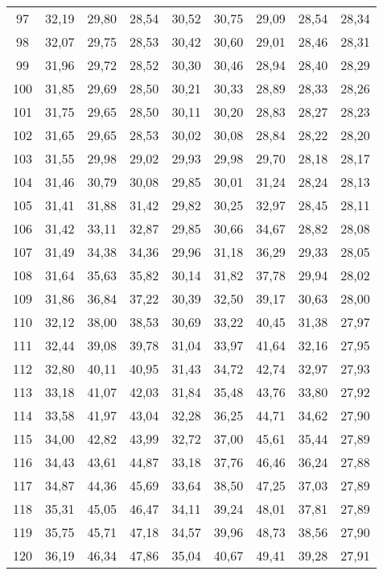 \begin{longtable}{c c c c c c c c c}
97	& 32,19	& 29,80	& 28,54	& 30,52	& 30,75	& 29,09	& 28,54	& 28,34 \\
98	& 32,07	& 29,75	& 28,53	& 30,42	& 30,60	& 29,01	& 28,46	& 28,31 \\
99	& 31,96	& 29,72	& 28,52	& 30,30	& 30,46	& 28,94	& 28,40	& 28,29 \\
100	& 31,85	& 29,69	& 28,50	& 30,21	& 30,33	& 28,89	& 28,33	& 28,26 \\
101	& 31,75	& 29,65	& 28,50	& 30,11	& 30,20	& 28,83	& 28,27	& 28,23 \\
102	& 31,65	& 29,65	& 28,53	& 30,02	& 30,08	& 28,84	& 28,22	& 28,20 \\
103	& 31,55	& 29,98	& 29,02	& 29,93	& 29,98	& 29,70	& 28,18	& 28,17 \\
104	& 31,46	& 30,79	& 30,08	& 29,85	& 30,01	& 31,24	& 28,24	& 28,13 \\
105	& 31,41	& 31,88	& 31,42	& 29,82	& 30,25	& 32,97	& 28,45	& 28,11 \\
106	& 31,42	& 33,11	& 32,87	& 29,85	& 30,66	& 34,67	& 28,82	& 28,08 \\
107	& 31,49	& 34,38	& 34,36	& 29,96	& 31,18	& 36,29	& 29,33	& 28,05 \\
108	& 31,64	& 35,63	& 35,82	& 30,14	& 31,82	& 37,78	& 29,94	& 28,02 \\
109	& 31,86	& 36,84	& 37,22	& 30,39	& 32,50	& 39,17	& 30,63	& 28,00 \\
110	& 32,12	& 38,00	& 38,53	& 30,69	& 33,22	& 40,45	& 31,38	& 27,97 \\
111	& 32,44	& 39,08	& 39,78	& 31,04	& 33,97	& 41,64	& 32,16	& 27,95 \\
112	& 32,80	& 40,11	& 40,95	& 31,43	& 34,72	& 42,74	& 32,97	& 27,93 \\
113	& 33,18	& 41,07	& 42,03	& 31,84	& 35,48	& 43,76	& 33,80	& 27,92 \\
114	& 33,58	& 41,97	& 43,04	& 32,28	& 36,25	& 44,71	& 34,62	& 27,90 \\
115	& 34,00	& 42,82	& 43,99	& 32,72	& 37,00	& 45,61	& 35,44	& 27,89 \\
116	& 34,43	& 43,61	& 44,87	& 33,18	& 37,76	& 46,46	& 36,24	& 27,88 \\
117	& 34,87	& 44,36	& 45,69	& 33,64	& 38,50	& 47,25	& 37,03	& 27,89 \\
118	& 35,31	& 45,05	& 46,47	& 34,11	& 39,24	& 48,01	& 37,81	& 27,89 \\
119	& 35,75	& 45,71	& 47,18	& 34,57	& 39,96	& 48,73	& 38,56	& 27,90 \\
120	& 36,19	& 46,34	& 47,86	& 35,04	& 40,67	& 49,41	& 39,28	& 27,91 \\

\end{longtable}
